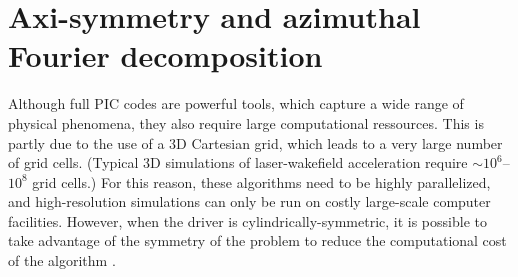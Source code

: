 \documentclass[]{report}
\begin{document}
\section{Axi-symmetry and azimuthal Fourier decomposition}

Although full PIC codes are powerful tools, which capture a wide range
of physical phenomena, they also require large computational ressources. 
This is partly due to the use of a 3D Cartesian grid, which
leads to a very large number of grid cells. (Typical 3D simulations of
laser-wakefield acceleration require $\sim 10^6$--$ 10^8$ grid
cells.) For this reason, these algorithms need to be highly parallelized, and
high-resolution simulations can only be run on costly large-scale
computer facilities. However, when the driver is
cylindrically-symmetric, it is possible to take advantage of the
symmetry of the problem to reduce the computational cost of the algorithm \cite{godfrey1985iprop,LifschitzJCP2009,DavidsonJCP2015,Lehe2016}.
\end{document}

